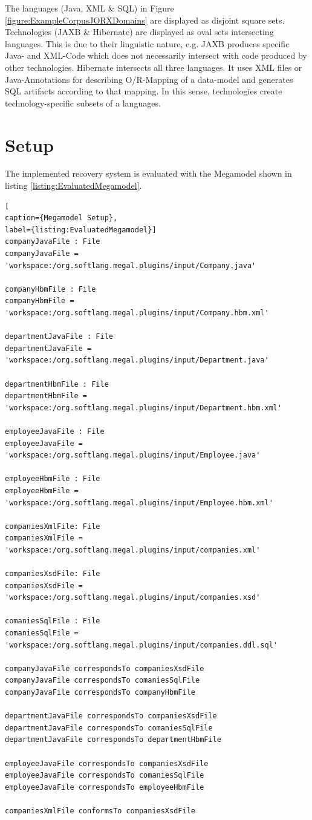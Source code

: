 The languages (\gls{Java}, \gls{XML} \& \gls{SQL}) in Figure \ref{figure:ExampleCorpusJORXDomains} are displayed as disjoint square sets.
Technologies (\gls{JAXB} \& \gls{Hibernate}) are displayed as oval sets intersecting languages.
This is due to their linguistic nature, e.g. \gls{JAXB} produces specific \Gls{Java}- and \gls{XML}-Code which does not necessarily intersect with code produced by other technologies.
\gls{Hibernate} intersects all three languages.
It uses \gls{XML} files or \gls{Java}-Annotations for describing \gls{O/R-Mapping} of a data-model and generates \gls{SQL} artifacts according to that mapping.
In this sense, technologies create technology-specific subsets of a languages.

\section{Setup}
\label{section:Setup}
The implemented recovery system is evaluated with the \gls{Megamodel} shown in listing \ref{listing:EvaluatedMegamodel}.
\begin{lstlisting}[
caption={Megamodel Setup},
label={listing:EvaluatedMegamodel}]
companyJavaFile : File
companyJavaFile = 'workspace:/org.softlang.megal.plugins/input/Company.java'

companyHbmFile : File
companyHbmFile = 'workspace:/org.softlang.megal.plugins/input/Company.hbm.xml'

departmentJavaFile : File
departmentJavaFile = 'workspace:/org.softlang.megal.plugins/input/Department.java'

departmentHbmFile : File
departmentHbmFile = 'workspace:/org.softlang.megal.plugins/input/Department.hbm.xml'

employeeJavaFile : File
employeeJavaFile = 'workspace:/org.softlang.megal.plugins/input/Employee.java'

employeeHbmFile : File
employeeHbmFile = 'workspace:/org.softlang.megal.plugins/input/Employee.hbm.xml'

companiesXmlFile: File
companiesXmlFile = 'workspace:/org.softlang.megal.plugins/input/companies.xml'

companiesXsdFile: File
companiesXsdFile = 'workspace:/org.softlang.megal.plugins/input/companies.xsd'

comaniesSqlFile : File
comaniesSqlFile = 'workspace:/org.softlang.megal.plugins/input/companies.ddl.sql'

companyJavaFile correspondsTo companiesXsdFile
companyJavaFile correspondsTo comaniesSqlFile
companyJavaFile correspondsTo companyHbmFile

departmentJavaFile correspondsTo companiesXsdFile
departmentJavaFile correspondsTo comaniesSqlFile
departmentJavaFile correspondsTo departmentHbmFile

employeeJavaFile correspondsTo companiesXsdFile
employeeJavaFile correspondsTo comaniesSqlFile
employeeJavaFile correspondsTo employeeHbmFile

companiesXmlFile conformsTo companiesXsdFile
\end{lstlisting}
